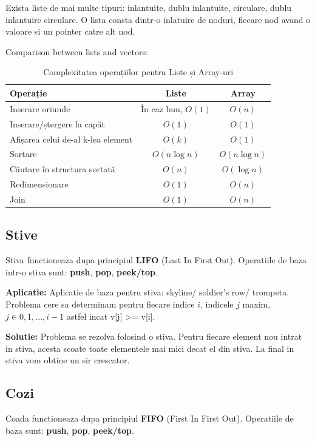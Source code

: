 \documentclass[11pt,a4paper]{article}
\theoremstyle{definition}
\theoremstyle{plain}
\theoremstyle{remark}
\begin{document}
Exista liste de mai multe tipuri: inlantuite, dublu inlantuite, circulare, dublu inlantuire circulare. O lista consta dintr-o inlatuire de noduri, fiecare nod avand o valoare si un pointer catre alt nod.

Comparison between lists and vectors:
\begin{table}[h!]
\centering

\begin{tabular}
{|>{\raggedright\arraybackslash}m{5cm}|c|c|}
\hline
\textbf{Operație} & \textbf{Liste} & \textbf{Array} \\
\hline
Inserare oriunde & În caz bun, \( O(1) \) & \( O(n) \) \\
\hline
Inserare/ștergere la capăt & \( O(1) \) & \( O(1) \) \\
\hline
Afișarea celui de-al k-lea element & \( O(k) \) & \( O(1) \) \\
\hline
Sortare & \( O(n \log n) \) & \( O(n \log n) \) \\
\hline
Căutare în structura sortată & \( O(n) \) & \( O(\log n) \) \\
\hline
Redimensionare & \( O(1) \) & \( O(n) \) \\
\hline
Join & \( O(1) \) & \( O(n) \) \\
\hline
\end{tabular}
\caption{Complexitatea operațiilor pentru Liste și Array-uri}
\end{table}

\subsection{Stive}
Stiva functioneaza dupa principiul \textbf{LIFO} (Last In First Out).
Operatiile de baza intr-o stiva sunt: \textbf{push}, \textbf{pop}, \textbf{peek/top}.

\textbf{Aplicatie:}
Aplicatie de baza pentru stiva: skyline/ soldier's row/ trompeta. Problema cere sa determinam pentru fiecare indice $i$, indicele $j$ maxim, $j \in {0, 1, ..., i-1}$ astfel incat v[j] >= v[i]. 

\textbf{Solutie:}
Problema se rezolva folosind o stiva. Pentru fiecare element nou intrat in stiva, acesta scoate toate elementele mai mici decat el din stiva. La final in stiva vom obtine un sir crescator.

\subsection{Cozi}
Coada functioneaza dupa principiul \textbf{FIFO} (First In First Out). Operatiile de baza sunt: \textbf{push}, \textbf{pop}, \textbf{peek/top}.
\end{document}
